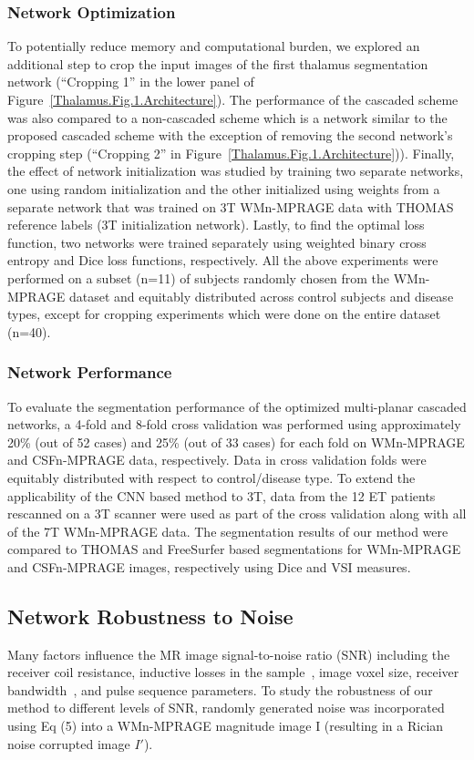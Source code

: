 \subsubsection{Network Optimization}
To potentially reduce memory and computational burden, we explored an additional step to crop the input images of the first thalamus segmentation network (``Cropping 1'' in the lower panel of Figure~\ref{Thalamus.Fig.1.Architecture}). The performance of the cascaded scheme was also compared to a non-cascaded scheme which is a network similar to the proposed cascaded scheme with the exception of removing the second network's cropping step (``Cropping 2'' in Figure~\ref{Thalamus.Fig.1.Architecture})). Finally, the effect of network initialization was studied by training two separate networks, one using random initialization and the other initialized using weights from a separate network that was trained on 3T WMn-MPRAGE data with THOMAS reference labels (3T initialization network). Lastly, to find the optimal loss function, two networks were trained separately using weighted binary cross entropy and Dice loss functions, respectively. All the above experiments were performed on a subset (n=11) of subjects randomly chosen from the WMn-MPRAGE dataset and equitably distributed across control subjects and disease types, except for cropping experiments which were done on the entire dataset (n=40).

\subsubsection{Network Performance}
To evaluate the segmentation performance of the optimized multi-planar cascaded networks, a 4-fold and 8-fold cross validation was performed using approximately 20\% (out of 52 cases) and 25\% (out of 33 cases) for each fold on WMn-MPRAGE and CSFn-MPRAGE data, respectively. Data in cross validation folds were equitably distributed with respect to control/disease type. To extend the applicability of the CNN based method to 3T, data from the 12 ET patients rescanned on a 3T scanner were used as part of the cross validation along with all of the 7T WMn-MPRAGE data. The segmentation results of our method were compared to THOMAS and FreeSurfer based segmentations for WMn-MPRAGE and CSFn-MPRAGE images, respectively using Dice and VSI measures.

\subsection{Network Robustness to Noise}
Many factors influence the MR image signal-to-noise ratio (SNR) including the receiver coil resistance, inductive losses in the sample~\cite{1921968:27964318}, image voxel size, receiver bandwidth~\cite{1921968:27964312}, and pulse sequence parameters. To study the robustness of our method to different levels of SNR, randomly generated noise was incorporated using Eq (5) into a WMn-MPRAGE magnitude image I (resulting in a Rician noise corrupted image $I'$).

